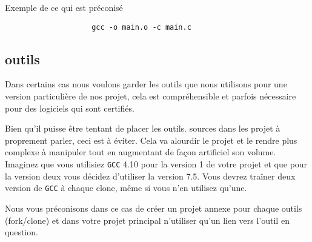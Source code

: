 			\begin{cbox}{Exemple de ce qui est préconisé}
				\begin{verbatim}
					gcc -o main.o -c main.c
				\end{verbatim}
			\end{cbox}

	\subsection{outils}
		Dans certains cas nous voulons garder les outils que nous utilisons pour une version particulière de nos projet, cela est compréhensible et parfois nécessaire pour des logiciels qui sont certifiés.

		Bien qu'il puisse être tentant de placer les outils. sources dans les projet à proprement parler, ceci est à éviter. Cela va alourdir le projet et le rendre plus complexe à manipuler tout en augmentant de façon artificiel son volume. Imaginez que vous utilisiez \verb+GCC+ 4.10 pour la version 1 de votre projet et que pour la version deux vous décidez d'utiliser la version 7.5. Vous devrez traîner deux version de \verb+GCC+ à chaque clone, même si vous n'en utilisez qu'une.

		Nous vous préconisons dans ce cas de créer un projet annexe pour chaque outils (fork/clone) et dans votre projet principal n'utiliser qu'un lien vers 
		l’outil en question.
